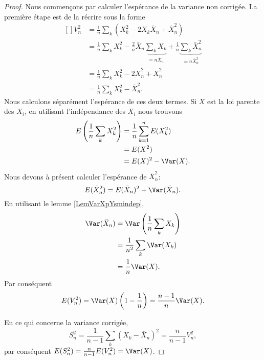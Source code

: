 \begin{proof}
    Nous commençons par calculer l'espérance de la variance non corrigée. La première étape est de la récrire sous la forme
    \begin{equation}
        \begin{aligned}[]
            V_n^2&=\frac{1}{ n }\sum_k(X_k^2-2X_k\bar X_n+\bar X_n^2)\\
            &=\frac{1}{ n }\sum_kX_k^2-\frac{ 2 }{ n }\bar X_n\underbrace{\sum_kX_k}_{=n\bar X_n}+\frac{1}{ n }\underbrace{\sum_k\bar X_n^2}_{=n\bar X_n^2}\\
            &=\frac{1}{ n }\sum_kX_k^2-2\bar X_n^2+\bar X_n^2\\
            &=\frac{1}{ n }\sum_kX_k^2-\bar X_n^2.
        \end{aligned}
    \end{equation}
    Nous calculons séparément l'espérance de ces deux termes. Si \( X\) est la loi parente des \( X_i\), en utilisant l'indépendance des \( X_i\) nous trouvons
    \begin{equation}
        \begin{aligned}[]
            E\left( \frac{1}{ n }\sum_kX_k^2 \right)&=\frac{1}{ n }\sum_{k=1}^nE(X_k^2)\\
            &=E(X^2)\\
            &=E(X)^2-\Var(X).
        \end{aligned}
    \end{equation}
    Nous devons à présent calculer l'espérance de \( \bar X_n^2\):
    \begin{equation}
        E(\bar X_n^2)=E(\bar X_n)^2+\Var(\bar X_n).
    \end{equation}
    En utilisant le lemme \ref{LemVarXpYsmindep},
    \begin{subequations}
        \begin{align}
            \Var(\bar X_n)&=\Var\left( \frac{1}{ n }\sum_kX_k \right)\\
            &=\frac{1}{ n^2 }\sum_k\Var(X_k)\\
            &=\frac{1}{ n }\Var(X).
        \end{align}
    \end{subequations}
    Par conséquent
    \begin{equation}
        E(V_n^2)=\Var(X)\left( 1-\frac{1}{ n } \right)=\frac{ n-1 }{ n }\Var(X).
    \end{equation}

    En ce qui concerne la variance corrigée,
    \begin{equation}
        S_n^2=\frac{1}{ n-1 }\sum_k(X_k-\bar X_n)^2=\frac{ n }{ n-1 }V_n^2,
    \end{equation}
    par conséquent \( E(S_n^2)=\frac{ n }{ n-1 }E(V_n^2)=\Var(X)\).
\end{proof}

